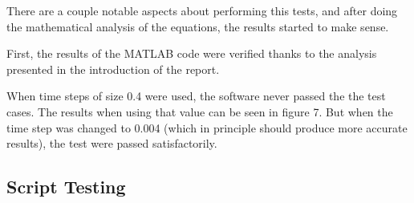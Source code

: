 \documentclass[12pt,a4paper]{article}
\begin{document}
There are a couple notable aspects about performing this tests, and after doing the mathematical analysis of the equations, the results started to make sense. 

First, the results of the MATLAB code were verified thanks to the analysis presented in the introduction of the report.

When time steps of size 0.4 were used, the software never passed the the test cases. The results when using that value can be seen in figure 7. But when the time step was changed to 0.004 (which in principle should produce more accurate results), the test were passed satisfactorily. 





\subsection{Script Testing}

\end{document}
